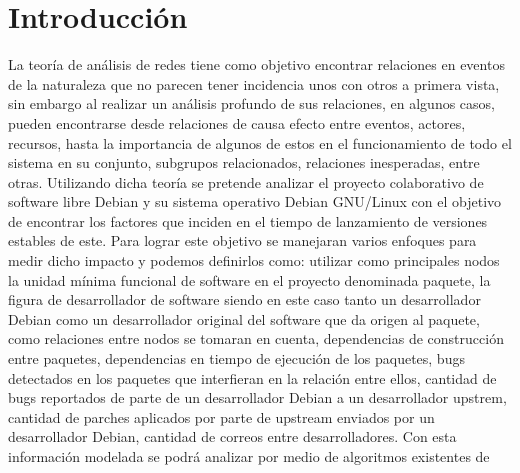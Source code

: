 \documentclass[12pt]{report}
\begin{document}
\begin{comment}
Tenes que poner en tu proposito cual es TU problema,
y porque es un problema importante para otros (individuos, comunidad)
, actualmente lo planteas como "el software que se atrasa es malo y
de panzaso creo que encontrare la solución mediante Debian Linux.
\end{comment}

\chapter*{Introducción}  
La teoría  de  análisis de  redes tiene  como
objetivo  encontrar relaciones  en  eventos de  la  naturaleza que  no
parecen tener incidencia  unos con otros a primera  vista, sin embargo
al realizar un análisis profundo  de sus relaciones, en algunos casos,
pueden  encontrarse desde  relaciones de  causa efecto  entre eventos,
actores,  recursos, hasta  la importancia  de algunos  de estos  en el
funcionamiento  de   todo  el   sistema  en  su   conjunto,  subgrupos
relacionados,  relaciones inesperadas,  entre otras.  Utilizando dicha
teoría se pretende analizar el proyecto colaborativo de software libre
Debian  y su  sistema operativo  Debian GNU/Linux  con el  objetivo de
encontrar  los factores  que inciden  en el  tiempo de  lanzamiento de
versiones estables  de este.  Para  lograr este objetivo  se manejaran
varios enfoques  para medir dicho  impacto y podemos  definirlos como:
utilizar como principales nodos la unidad mínima funcional de software
en  el proyecto  denominada  paquete, la  figura  de desarrollador  de
software siendo  en este  caso tanto un  desarrollador Debian  como un
desarrollador original  del software  que da  origen al  paquete, como
relaciones  entre   nodos  se  tomaran  en   cuenta,  dependencias  de
construcción entre  paquetes, dependencias  en tiempo de  ejecución de
los paquetes,  bugs detectados en  los paquetes que interfieran  en la
relación  entre ellos,  cantidad de  bugs  reportados de  parte de  un
desarrollador Debian  a un desarrollador upstrem,  cantidad de parches
aplicados por parte de upstream  enviados por un desarrollador Debian,
cantidad  de  correos  entre  desarrolladores.  Con  esta  información
modelada  se podrá  analizar  por medio  de  algoritmos existentes  de
\end{document}

